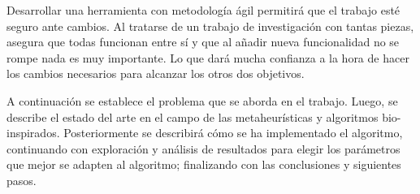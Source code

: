 Desarrollar una herramienta con metodología ágil permitirá que el trabajo esté seguro ante cambios. Al tratarse de un
trabajo de investigación con tantas piezas, asegura que todas funcionan entre sí y que al añadir nueva funcionalidad
no se rompe nada es muy importante. Lo que dará mucha confianza a la hora de hacer los cambios necesarios para alcanzar
los otros dos objetivos.

A continuación se establece el problema que se aborda en el trabajo. Luego, se describe el estado del arte en el campo
de las metaheurísticas y algoritmos bio-inspirados. Posteriormente se describirá cómo se ha implementado el algoritmo,
continuando con exploración y análisis de resultados para elegir los parámetros que mejor se adapten al algoritmo; 
finalizando con las conclusiones y siguientes pasos.
